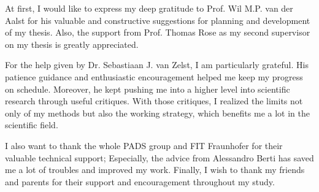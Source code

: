 At first, I would like to express my deep gratitude to Prof. Wil M.P. van der Aalst for his valuable and constructive suggestions for planning and development of my thesis. Also, the support from Prof. Thomas Rose as my second supervisor on my thesis is greatly appreciated.


For the help given by Dr. Sebastiaan J. van Zelst, I am particularly grateful. His patience guidance and enthusiastic encouragement helped me keep my progress on schedule. Moreover, he kept pushing me into a higher level into scientific research through useful critiques. With those critiques, I realized the limits not only of my methods but also the working strategy, which benefits me a lot in the scientific field.  

I also want to thank the whole PADS group and FIT Fraunhofer for their valuable technical support; Especially, the advice from Alessandro Berti has saved me a lot of troubles and improved my work. 
Finally, I wish to thank my friends and parents for their support and encouragement throughout my study.